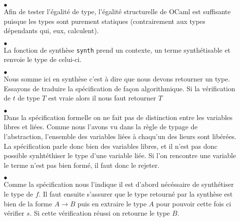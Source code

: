 \documentclass {article}
\newcommand{\codefrom}[3]
           {}
\theoremstyle{definition}
\theoremstyle{remark}
\begin{document}
\begin{itemize}
\item[$\bullet$]  \\


Afin de tester l'égalité de type, l'égalité structurelle de OCaml est
suffisante puisque les types sont purement statiques (contrairement
aux types dépendants qui, eux, calculent).
%
\codefrom{typed}{lambda}{check_inv}
  

\item[$\bullet$] \\

La fonction de synthèse \lstinline!synth! prend un contexte, un
terme synthétisable et renvoie le type de celui-ci.

 \codefrom{typed}{lambda}{synth_def}

\item[$\bullet$]  \\

  Nous somme ici en synthèse c'est à dire que nous devons retourner un type.
  Essayons de traduire la spécification de façon algorithmique. Si la vérification
  de $t$ de type $T$ est vraie alors il nous faut retourner $T$
  
\codefrom{typed}{lambda}{synth_ann}



\item[$\bullet$] \\

Dans la spécification formelle on ne fait pas de distinction entre les variables libres et liées.
Comme nous l'avons vu dans la règle de typage de l'abstraction, l'ensemble des variables
liées à chaqu'un des lieurs sont libérées. La spécification parle donc bien des variables libres,
et il n'est pas donc possible synhtéthiser le type d'une variable liée. Si l'on rencontre une variable
le terme n'est pas bien formé, il faut donc le rejeter.

\codefrom{typed}{lambda}{synth_var}

\item[$\bullet$] \\

  
  Comme la spécification nous l'indique il est d'abord nécéssaire de synthétiser le type de $f$.
  Il faut ensuite s'assurer que le type retourné par la synthèse est bien de la forme $A\rightarrow B$
  puis en extraire le type $A$ pour pouvoir cette fois ci vérifier $s$. Si cette vérification réussi
  on retourne le type $B$.
 
\codefrom{typed}{lambda}{synth_appl}

\end{itemize}
\end{document}
